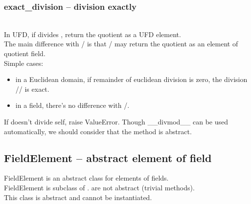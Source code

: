  \subsubsection{exact\_division -- division exactly}
   \\
   \spacing
   \quad In UFD, if  divides ,
   return the quotient as a UFD element. \\
   \spacing
   \quad  The main difference with / is that / may return the
        quotient as an element of quotient field.\\
    Simple cases:
    \begin{itemize}
      \item in a Euclidean domain, 
         if remainder of euclidean division is zero, the division // is exact.
      \item in a field, there's no difference with /.
    \end{itemize}
   If  doesn't divide self, raise ValueError.
   Though \_\_divmod\_\_ can be used automatically,
   we should consider that the method is abstract.\\
   \spacing
\C

 \subsection{\negok FieldElement -- abstract element of field}
  \quad FieldElement is an abstract class for elements of
    fields.\\
  \spacing
  \quad FieldElement is subclass of .
   are not abstract (trivial methods).\\
  \spacing
  This class is abstract and cannot be instantiated.\\
\C


